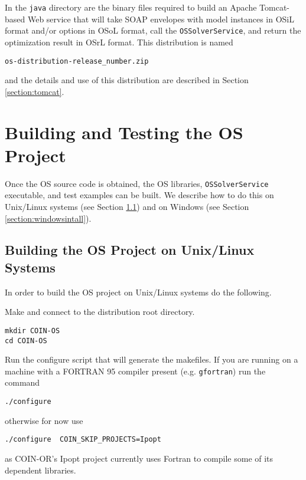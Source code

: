 \documentclass[11pt]{article}
\renewcommand{\_}{{\char"5F}}
\renewcommand{\{}{{\char"7B}}
\renewcommand{\}}{{\char"7D}}
\renewcommand{\^}{{\char"0D}}
\renewcommand{\'}{{\char"0D}}
\begin{document}
In the {\tt java} directory  are the binary files required to build an Apache Tomcat-based Web service that will take SOAP envelopes with model instances in OSiL format and/or options in OSoL format, call the {\tt OSSolverService}, and return the optimization result in OSrL format.  This distribution is named
\begin{verbatim}
os-distribution-release_number.zip
\end{verbatim}
and the details and use of this distribution are described in Section \ref{section:tomcat}.



\section{Building and Testing the OS Project}\label{section:build}


Once the OS source code is obtained, the OS libraries, {\tt OSSolverService} executable, and test examples can be built.  We describe how to do this on Unix/Linux systems (see Section \ref{section:unixbuilds})  and on Windows (see Section \ref{section:windowsintall}).

\subsection{Building the OS Project on Unix/Linux Systems}\label{section:unixbuilds}

In order to build the OS project on Unix/Linux systems do the following.

\vskip 8pt


  Make and connect to the distribution root directory.

\begin{verbatim}
mkdir COIN-OS
cd COIN-OS
\end{verbatim}


 Run the configure script that will generate the makefiles.  If you are running on a machine with a FORTRAN 95 compiler present (e.g. {\tt gfortran}) run the command

\begin{verbatim}
./configure
\end{verbatim}

\noindent otherwise for now use

\begin{verbatim}
./configure  COIN_SKIP_PROJECTS=Ipopt
\end{verbatim}
as COIN-OR's Ipopt project currently uses Fortran to compile some of its dependent libraries.
\end{document}

